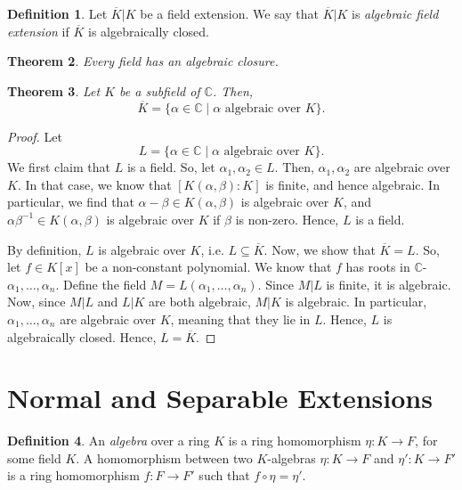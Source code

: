 \documentclass[a4paper, openany]{memoir}
\theoremstyle{definition}
\newtheorem{definition}{Definition}[section]
\theoremstyle{plain}
\newtheorem{theorem}[definition]{Theorem}
\begin{document}
    \begin{definition}
        Let $\overline{K}|K$ be a field extension. We say that $\overline{K}|K$ is \emph{algebraic field extension} if $\overline{K}$ is algebraically closed.
    \end{definition}

    \begin{theorem}
        Every field has an algebraic closure.
    \end{theorem}

    \begin{theorem}
        Let $K$ be a subfield of $\mathbb{C}$. Then,
        \[\overline{K} = \{\alpha \in \mathbb{C} \mid \alpha \textrm{ algebraic over } K\}.\]
    \end{theorem}
    \begin{proof}
        Let
        \[L = \{\alpha \in \mathbb{C} \mid \alpha \textrm{ algebraic over } K\}.\]
        We first claim that $L$ is a field. So, let $\alpha_1, \alpha_2 \in L$. Then, $\alpha_1, \alpha_2$ are algebraic over $K$. In that case, we know that $[K(\alpha, \beta) : K]$ is finite, and hence algebraic. In particular, we find that $\alpha - \beta \in K(\alpha, \beta)$ is algebraic over $K$, and $\alpha \beta^{-1} \in K(\alpha, \beta)$ is algebraic over $K$ if $\beta$ is non-zero. Hence, $L$ is a field.

        By definition, $L$ is algebraic over $K$, i.e. $L \subseteq \overline{K}$. Now, we show that $\overline{K} = L$. So, let $f \in K[x]$ be a non-constant polynomial. We know that $f$ has roots in $\mathbb{C}$- $\alpha_1, \dots, \alpha_n$. Define the field $M = L(\alpha_1, \dots, \alpha_n)$. Since $M|L$ is finite, it is algebraic. Now, since $M|L$ and $L|K$ are both algebraic, $M|K$ is algebraic. In particular, $\alpha_1, \dots, \alpha_n$ are algebraic over $K$, meaning that they lie in $L$. Hence, $L$ is algebraically closed. Hence, $L = \overline{K}$.
    \end{proof}


    \newpage

    \section{Normal and Separable Extensions}
    \begin{definition}
        An \emph{algebra} over a ring $K$ is a ring homomorphism $\eta \colon K \to F$, for some field $K$. A homomorphism between two $K$-algebras $\eta \colon K \to F$ and $\eta' \colon K \to F'$ is a ring homomorphism $f \colon F \to F'$ such that $f \circ \eta = \eta'$.
    \end{definition}
\end{document}
